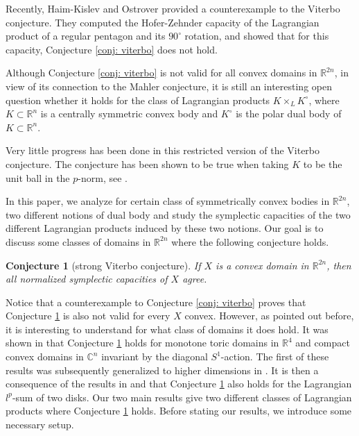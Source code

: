 \documentclass{article}
\newtheorem{conj}[theorem]{Conjecture}
\theoremstyle{definition}
\begin{document}
Recently, Haim-Kislev and Ostrover \cite{HaimKislev2024ACT} provided a counterexample to the Viterbo conjecture. They computed the Hofer-Zehnder capacity of the Lagrangian product of a regular pentagon and its $90^{\circ}$ rotation, and showed that for this capacity, Conjecture \ref{conj: viterbo} does not hold.

Although Conjecture \ref{conj: viterbo} is not valid for all convex domains in $\mathbb{R}^{2n}$, in view of its connection to the Mahler conjecture, it is still an interesting open question whether it holds for the class of Lagrangian products $K\times_L K^{\circ}$, where $K\subset\mathbb{R}^n$ is a centrally symmetric convex body and $K^{\circ}$ is the polar dual body of $K\subset \mathbb{R}^n$.

Very little progress has been done in this restricted version of the Viterbo conjecture. The conjecture has been shown to be true when taking $K$ to be the unit ball in the $p$-norm, see \cite{Karasev2019MahlersCF}. 

In this paper, we analyze for certain class of symmetrically convex bodies in $\mathbb{R}^{2n}$, two different notions of dual body and study the symplectic capacities of the two different Lagrangian products induced by these two notions. Our goal is to discuss some classes of domains in $\mathbb{R}^{2n}$ where the following conjecture holds. 

\begin{conj}[strong Viterbo conjecture]\label{conj: viterbo2}
If $X$ is a convex domain in $\mathbb{R}^{2n}$, then all
normalized symplectic capacities of $X$ agree.
\end{conj}

Notice that a counterexample to Conjecture \ref{conj: viterbo} proves that Conjecture \ref{conj: viterbo2} is also not valid for every $X$ convex. However, as pointed out before, it is interesting to understand for what class of domains it does hold. It was shown in \cite{Gutt2022ExamplesAT} that Conjecture \ref{conj: viterbo2} holds for monotone toric domains in $\mathbb{R}^4$ and compact convex domains in $\mathbb{C}^n$ invariant by the diagonal $S^1$-action. The first of these results was subsequently generalized to higher dimensions in \cite{CristofaroGardiner2023OnTA}. It is then a consequence of the results in \cite{Ostrover2019SymplecticEO} and \cite{Gutt2022ExamplesAT} that Conjecture \ref{conj: viterbo2} also holds for the Lagrangian $l^p$-sum of two disks. Our two main results give two different classes of Lagrangian products where Conjecture \ref{conj: viterbo2} holds. Before stating our results, we introduce some necessary setup. 
\end{document}
